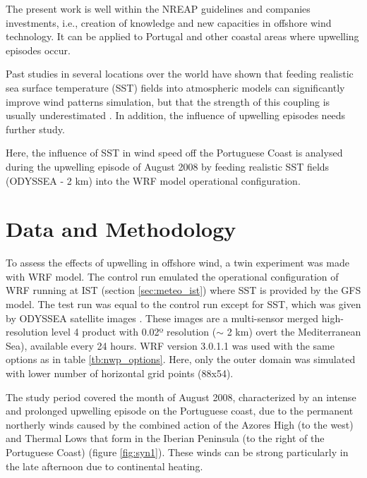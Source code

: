 The present work is well within the NREAP guidelines and companies investments, i.e., creation of knowledge and new capacities in offshore wind technology. It can be applied to Portugal and other coastal areas where upwelling episodes occur.

Past studies in several locations over the world have shown that feeding realistic sea surface temperature (SST) fields into atmospheric models can significantly improve wind patterns simulation, but that the strength of this coupling is usually underestimated \citep{Song2009}. In addition, the influence of upwelling episodes needs further study.

Here, the influence of SST in wind speed off the Portuguese Coast is analysed during the upwelling episode of August 2008 by feeding realistic SST fields (ODYSSEA - 2 km) into the WRF model operational configuration.

\section{Data and Methodology}

To assess the effects of upwelling in offshore wind, a twin experiment was made with WRF model. The control run emulated the operational configuration of WRF running at IST (section \ref{sec:meteo_ist}) where SST is provided by the GFS model. The test run was equal to the control run except for SST, which was given by ODYSSEA satellite images \citep{Odyssea2005}.  These images are a multi-sensor merged high-resolution level 4 product with 0.02º resolution ($\sim$ 2 km) overt the Mediterranean Sea), available every 24 hours. WRF version 3.0.1.1 was used with the same options as in table \ref{tb:nwp_options}. Here, only the outer domain was simulated with lower number of horizontal grid points (88x54). 

The study period covered the month of August 2008, characterized by an intense and prolonged upwelling episode on the Portuguese coast, due to the permanent northerly winds caused by the combined action of the Azores High (to the west) and Thermal Lows that form in the Iberian Peninsula (to the right of the Portuguese Coast) (figure \ref{fig:syn1}). These winds can be strong particularly in the late afternoon due to continental heating.

